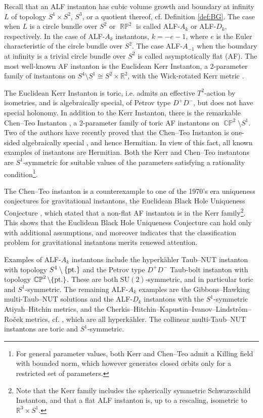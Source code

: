 \documentclass[a4paper,11pt,reqno]{amsart}
\newcommand{\Reals}{\mathbb{R}}
\theoremstyle{plain}
\DeclareMathOperator{\CP}{\mathbb{C}\mathbb{P}}
\DeclareMathOperator{\RP}{\mathbb{R}\mathbb{P}}
\newcommand{\SU}{\text{SU}}
\numberwithin{equation}{section}
\begin{document}
%

Recall that an ALF instanton has cubic volume growth and boundary at infinity $L$ of topology $S^1\times S^2$, $S^3$, or a quotient thereof, cf. Definition \ref{def:BG}. The case when $L$ is a circle bundle over $S^2$ or $\RP^2$ is called ALF-$A_k$ or ALF-$D_k$, respectively. %
In the case of  ALF-$A_k$ instantons, $k = - e -1$, where $e$ is the Euler characteristic of the circle bundle over $S^2$.
The case ALF-$A_{-1}$ when the boundary at infinity is a trivial circle bundle over $S^2$ is called asymptotically flat (AF). 
%
The most well-known AF instanton is the Euclidean Kerr Instanton, a 2-parameter family of instantons on  $S^4 \setminus S^1 \cong S^2 \times \Reals^2$, with the Wick-rotated  Kerr metric \cite{1977PhRvD..15.2752G,1978RSPSA.358..467G,1998PhRvD..59b4009H}. 

The Euclidean Kerr Instanton is toric, i.e. admits an effective $T^2$-action by isometries, and is algebraically special, of Petrov type $D^+D^-$, but does not have special holonomy.   
%
In addition to the Kerr Instanton, there is the remarkable Chen--Teo Instanton \cite{2011PhLB..703..359C}, a 2-parameter family of toric AF instantons on $\CP^2 \setminus S^1$. %
Two of the authors have recently proved that the Chen--Teo Instanton is one-sided algebraically special \cite{aksteiner2021gravitational}, and hence Hermitian. In view of this fact, all known examples of instantons are Hermitian. Both the  Kerr and Chen--Teo instantons are $S^1$-symmetric for suitable values of the parameters satisfying a rationality condition\footnote{For general parameter values, both Kerr and Chen--Teo admit a Killing field with bounded norm, which however generates closed orbits only for a restricted set of parameters.}. 

The Chen--Teo instanton is a counterexample to one of the 1970's era uniqueness conjectures for gravitational instantons, the Euclidean Black Hole Uniqueness Conjecture \cite[Conjecture 2]{gibbons:1978:survey}, which stated that a non-flat AF instanton is in the Kerr family\footnote{Note that the Kerr family includes the spherically symmetric Schwarzschild Instanton, and that a flat ALF instanton is, up to a rescaling,  isometric to $\Reals^3 \times S^1$.}. This shows that the Euclidean Black Hole Uniqueness Conjecture can hold only with additional assumptions, and moreover indicates that the classification problem for gravitational instantons merits renewed attention. 


Examples of ALF-$A_k$ instantons include the hyperk\"ahler Taub--NUT instanton \cite{hawking:1977:grav:instantons,lebrun:1989} with topology $S^4 \setminus \{\text{\rm pt.}\}$ and the Petrov type $D^+D^-$ Taub-bolt instanton \cite{1978PhLB...78..249P} with topology $\CP^2 \setminus \{\text{\rm pt.}\}$. These are both $\SU(2)$-symmetric, and in particular toric and $S^1$-symmetric. The remaining ALF-$A_k$ examples are the   
Gibbons--Hawking multi-Taub--NUT solutions and the ALF-$D_k$ instantons with the $S^1$-symmetric Atiyah--Hitchin metrics, and the  
Cherkis--Hitchin--Kapus\-tin--Ivanov--Lindstr\"om--Ro\v{c}ek metrics, cf. \cite{MR2177322,chen2019gravitational}, 
%
which are all hyperkähler.
The collinear multi-Taub--NUT instantons are toric and $S^1$-symmetric. 
\end{document}
